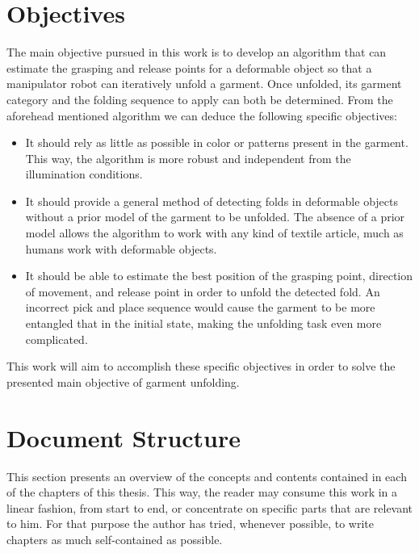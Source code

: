 \section{Objectives}
\label{intro_objectives}
The main objective pursued in this work is to develop an algorithm that can estimate the grasping and release points for a deformable object so that a manipulator robot can iteratively unfold a garment. Once unfolded, its garment category  and the folding sequence to apply can both be determined. From the aforehead mentioned algorithm we can deduce the following specific objectives:

\begin{itemize}
	\item It should rely as little as possible in color or patterns present in the garment. This way, the algorithm is more robust and independent from the illumination conditions.
	\item It should provide a general method of detecting folds in deformable objects without a prior model of the garment to be unfolded. The absence of a prior model allows the algorithm to work with any kind of textile article, much as humans work with deformable objects.
	\item It should be able to estimate the best position of the grasping point, direction of movement, and release point in order to unfold the detected fold. An incorrect pick and place sequence would cause the garment to be more entangled that in the initial state, making the unfolding task even more complicated.
\end{itemize}


This work will aim to accomplish these specific objectives in order to solve the presented main objective of garment unfolding.

\section{Document Structure}
\label{intro_structure}

This section presents an overview of the concepts and contents contained in each of the chapters of this thesis. This way, the reader may consume this work in a linear fashion, from start to end, or concentrate on specific parts that are relevant to him. For that purpose the author has tried, whenever possible, to write chapters as much self-contained as possible.


